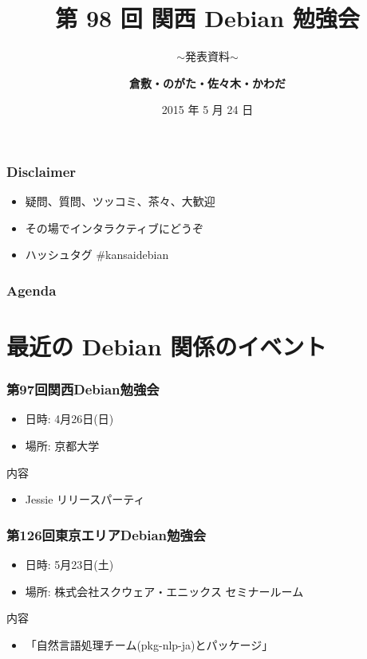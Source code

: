 \documentclass[cjk,dvipdfmx,10pt,compress,%
hyperref={bookmarks=true,bookmarksnumbered=true,bookmarksopen=false,%
colorlinks=false,%
pdftitle={第 98 回 関西 Debian 勉強会},%
pdfauthor={倉敷・のがた・佐々木・かわだ},%
pdfsubject={資料},%
}]{beamer}
\title{第 98 回 関西 Debian 勉強会}
\subtitle{$\sim$発表資料$\sim$}
\author[かわだ てつたろう]{{\large\bf 倉敷・のがた・佐々木・かわだ}}
\institute[Debian JP]{{\normalsize\tt 関西 Debian 勉強会}}
\date{{\small 2015 年 5 月 24 日}}
\begin{document}
\settitleslide
\begin{frame}
\titlepage
\end{frame}
\setdefaultslide

\begin{frame}[fragile]
  \frametitle{Disclaimer}
  \begin{itemize}
  \item 疑問、質問、ツッコミ、茶々、\alert{大歓迎}
  \item その場でインタラクティブにどうぞ
  \item ハッシュタグ \#kansaidebian
  \end{itemize}
\end{frame}

\begin{frame}[fragile]
\frametitle{Agenda}

\tableofcontents

\end{frame}

\section{最近の Debian 関係のイベント}


\begin{frame}[fragile]
  \frametitle{第97回関西Debian勉強会}
  \begin{itemize}
  \item 日時: 4月26日(日)
  \item 場所: 京都大学
  \end{itemize}
  \begin{block}{内容}
    \begin{itemize}
    \item Jessie リリースパーティ
    \end{itemize}
  \end{block}
\end{frame}

\begin{frame}[fragile]
  \frametitle{第126回東京エリアDebian勉強会}
  \begin{itemize}
  \item 日時: 5月23日(土)
  \item 場所: 株式会社スクウェア・エニックス セミナールーム
  \end{itemize}
  \begin{block}{内容}
    \begin{itemize}
    \item 「自然言語処理チーム(pkg-nlp-ja)とパッケージ」
    \end{itemize}
  \end{block}
\end{frame}
\end{document}

